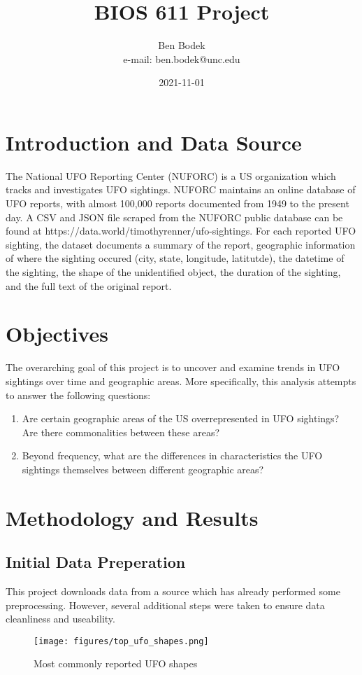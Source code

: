 \documentclass{article}
\begin{document}
\title{BIOS 611 Project}
\author{Ben Bodek \\ e-mail: ben.bodek@unc.edu}
\date{2021-11-01}
\maketitle

\section{Introduction and Data Source}
\par The National UFO Reporting Center (NUFORC) is a US organization which tracks and investigates UFO sightings. NUFORC maintains an online database of UFO reports, with almost 100,000 reports documented from 1949 to the present day. A CSV and JSON file scraped from the NUFORC public database can be found at https://data.world/timothyrenner/ufo-sightings. For each reported UFO sighting, the dataset documents a summary of the report, geographic information of where the sighting occured (city, state, longitude, latitutde), the datetime of the sighting, the shape of the unidentified object, the duration of the sighting, and the full text of the original report.

\section {Objectives}
  \par The overarching goal of this project is to uncover and examine trends in UFO sightings over time and geographic areas. More specifically, this analysis attempts to answer the following questions:
  \begin{enumerate}
    \item Are certain geographic areas of the US overrepresented in UFO sightings? Are there commonalities between these areas?
    \item Beyond frequency, what are the differences in characteristics the UFO sightings themselves between different geographic areas?
  \end{enumerate}
  
\section{Methodology and Results}
\subsection{Initial Data Preperation}
\par This project downloads data from a source which has already performed some preprocessing. However, several additional steps were taken to ensure data cleanliness and useability. 


\begin{figure}
  \centering
  \texttt{[image: figures/top\_ufo\_shapes.png]}
  \caption{Most commonly reported UFO shapes}
  \label{fig:ufo_shapes}
\end{figure}
\end{document}
